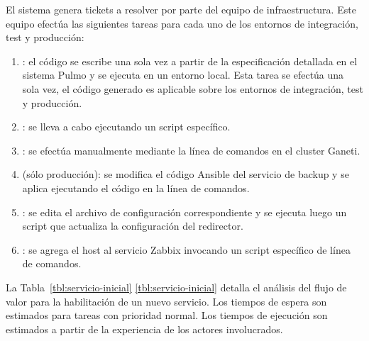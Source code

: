 El sistema genera tickets a resolver por parte del equipo de
infraestructura. Este equipo efectúa las siguientes tareas para cada
uno de los entornos de integración, test y producción:
%
\begin{enumerate}
\item {}: el código se escribe una sola vez
  a partir de la especificación detallada en el sistema Pulmo y se
  ejecuta en un entorno local. Esta tarea se efectúa una sola vez, el
  código generado es aplicable sobre los entornos de integración, test
  y producción.
\item {}: se
  lleva a cabo ejecutando un script específico.
\item {}: se efectúa manualmente mediante la línea de
  comandos en el cluster Ganeti.
\item {} (sólo producción):
  se modifica el código Ansible del servicio de backup y se aplica
  ejecutando el código en la línea de comandos.
\item {}: se edita el archivo de
  configuración correspondiente y se ejecuta luego un script que
  actualiza la configuración del redirector.
\item {}: se agrega el host al servicio Zabbix
  invocando un script específico de línea de comandos.
\end{enumerate}
%
La \iflatexml{}Tabla~\ref{tbl:servicio-inicial}\else%
\autoref{tbl:servicio-inicial}\fi{} detalla el análisis del flujo de
valor para la habilitación de un nuevo servicio. Los tiempos de espera
son estimados para tareas con prioridad normal. Los tiempos de
ejecución son estimados a partir de la experiencia de los actores
involucrados.
%
%
